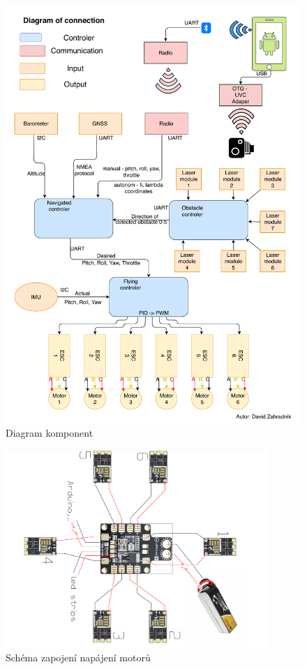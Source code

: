\begin{figure}[H]
	\centering
	\includegraphics[width=15cm]{pictures/DroneDiagram.pdf}
	\caption{Diagram komponent}
\end{figure}
\begin{figure}[h]
	\centering
	\includegraphics[width=10cm, angle=90]{pictures/pdb_com.pdf}
	\caption{Schéma zapojení napájení motorů}
\end{figure}
